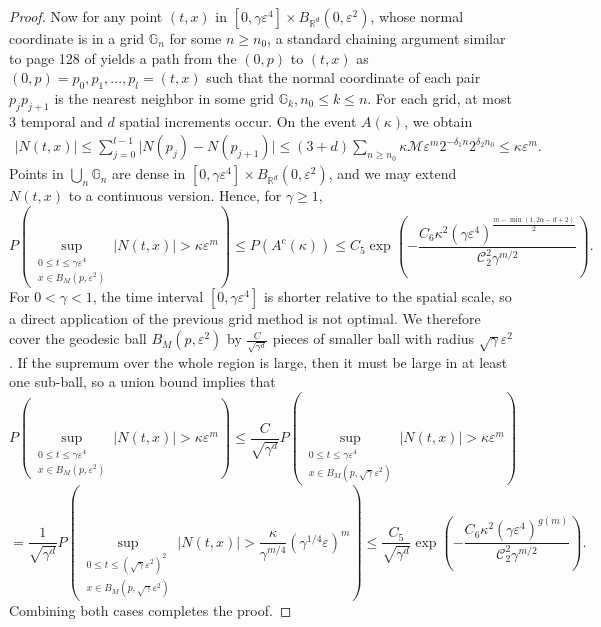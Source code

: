 \documentclass[12pt]{amsart}
\numberwithin{equation}{section}
\newcommand{\R}{\mathbb{R}}
\newcommand{\1}{\mathbf{1}}
\begin{document}
\begin{proof}
Now for any point $(t,x)$ in $\left[0,\gamma\varepsilon^4\right]\times B_{\R^d}(0,\varepsilon^2)$, whose normal coordinate is in a grid $\mathbb{G}_n$ for some $n \geq n_0$, a standard chaining argument similar to page 128 of \cite{dalang2009minicourse} yields a path from the $(0,p)$ to $(t,x)$ as $(0,p)= p_0,p_1,...,p_l = (t,x)$ such that the normal coordinate of each pair $p_jp_{j+1}$ is the nearest neighbor in some grid $\mathbb{G}_k, n_0\leq k \leq n$. For each grid, at most $3$ temporal and $d$ spatial increments occur. On the event $A(\kappa)$, we obtain
\begin{align*}
\vert N(t,x)\vert\leq \sum_{j=0}^{l-1}\vert N(p_j)-N(p_{j+1})\vert\leq (3+d)\sum_{n\geq n_0}\kappa \mathcal{M}\varepsilon^{m} 2^{-\delta_1n}2^{\delta_2n_0}\leq\kappa\varepsilon^{m} .
\end{align*}
Points in $\bigcup\limits_n\mathbb{G}_n$ are dense in $[0,\gamma\varepsilon^4]\times B_{\R^d}(0,\varepsilon^2)$, and we may extend $N(t,x)$ to a continuous version. Hence, for $\gamma\geq 1$,
\[
P\left(\sup_{\substack{0\leq t\leq\gamma\varepsilon^4\\ x\in B_M\left(p,\varepsilon^2\right)}}\vert N(t,x)\vert>\kappa\varepsilon^{m}\right)\leq P(A^c(\kappa))\leq  C_5\exp\left(-\frac{C_6\kappa^2(\gamma\varepsilon^4)^{\frac{m-\min(1,2\alpha-d+2)}{2}}}{\mathcal{C}_2^2\gamma^{m/2}}\right).
\]
For $0<\gamma<1$, the time interval $\left[0,\gamma\varepsilon^4\right]$ is shorter relative to the spatial scale, so a direct application of the previous grid method is not optimal. We therefore cover the geodesic ball $B_M(p,\varepsilon^2)$ by $\frac{C}{\sqrt{\gamma^d}}$ pieces of smaller ball with radius $\sqrt{\gamma}\varepsilon^2$. If the supremum over the whole region is large, then it must be large in at least one sub-ball, so a union bound implies that
\[P\left(\sup_{\substack{0\leq t\leq\gamma\varepsilon^4\\ x\in B_M\left(p,\varepsilon^2\right)}}\vert N(t,x)\vert>\kappa\varepsilon^{m}\right)\leq \frac{C}{\sqrt{\gamma^d}} P\left(\sup_{\substack{0\leq t\leq\gamma\varepsilon^4\\ x\in B_M\left(p,\sqrt{\gamma}\varepsilon^2\right)}}\vert N(t,x)\vert>\kappa\varepsilon^{m}\right)\]
\[=\frac{1}{\sqrt{\gamma^d}}P\left(\sup_{\substack{0\leq t\leq(\sqrt{\gamma}\varepsilon^2)^2\\ x\in B_M\left(p,\sqrt{\gamma}\varepsilon^2\right)}}\vert N(t,x)\vert>\frac{\kappa}{\gamma^{m/4}}\left(\gamma^{1/4}\varepsilon\right)^{m}\right)\leq \frac{C_5}{\sqrt{\gamma^d}}\exp\left(-\frac{C_6\kappa^2(\gamma\varepsilon^4)^{g(m)}}{ \mathcal{C}_2^2\gamma^{m/2}}\right).\]
Combining both cases completes the proof.
\end{proof}
\end{document}
